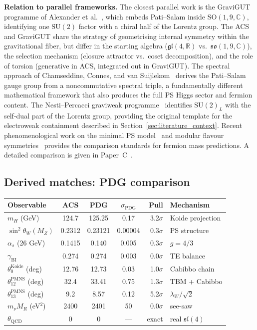 \documentclass[11pt,a4paper]{article}
\theoremstyle{plain}
\theoremstyle{definition}
\theoremstyle{remark}
\begin{document}
\textbf{Relation to parallel frameworks.}
The closest parallel work is the GraviGUT programme of Alexander
et al.~\cite{Alexander2025}, which embeds Pati--Salam inside
$\mathrm{SO}(1,9,\mathbb{C})$, identifying one $\mathrm{SU}(2)$
factor with a chiral half of the Lorentz group.  The ACS and GraviGUT
share the strategy of geometrising internal symmetry within the
gravitational fiber, but differ in the starting algebra
($\mathfrak{gl}(4,\mathbb{R})$ vs.\
$\mathfrak{so}(1,9,\mathbb{C})$), the selection mechanism
(closure attractor vs.\ coset decomposition), and the role of
torsion (generative in ACS, integrated out in GraviGUT).
The spectral approach of Chamseddine, Connes, and van
Suijlekom~\cite{ChamseddineConnes2015} derives the Pati--Salam gauge
group from a noncommutative spectral triple, a fundamentally different
mathematical framework that also produces the full PS Higgs sector
and fermion content.  The Nesti--Percacci
graviweak programme~\cite{NestiPercacci2008} identifies
$\mathrm{SU}(2)_L$ with the self-dual part of the Lorentz group,
providing the original template for the electroweak containment
described in Section~\ref{sec:literature_context}.
Recent phenomenological work on the minimal PS
model~\cite{MinimalPS2025} and modular flavour
symmetries~\cite{Belfkir2025} provides the comparison standards
for fermion mass predictions.
A detailed comparison is given in Paper~C~\cite{WallaceC}.

\subsection*{Derived matches: PDG comparison}
\label{sec:pdg-comparison}

\begin{center}
\begin{tabular}{lcccrl}
\toprule
Observable & ACS & PDG & $\sigma_{\mathrm{PDG}}$ & Pull & Mechanism \\
\midrule
$m_H$ (GeV)                  & 124.7     & 125.25     & 0.17     & 3.2$\sigma$ & Koide projection \\
$\sin^2\theta_W(M_Z)$        & 0.2312    & 0.23121    & 0.00004  & 0.3$\sigma$ & PS structure \\
$\alpha_s$ (26 GeV)           & 0.1415    & 0.140      & 0.005    & 0.3$\sigma$ & $g = 4/3$ \\
$\gamma_{\mathrm{BI}}$       & 0.274     & 0.274      & 0.003    & 0.0$\sigma$ & TE balance \\
$\theta_0^{\mathrm{Koide}}$ (deg) & 12.76 & 12.73     & 0.03     & 1.0$\sigma$ & Cabibbo chain \\
$\theta_{12}^{\mathrm{PMNS}}$ (deg) & 32.4 & 33.41   & 0.75     & 1.3$\sigma$ & TBM + Cabibbo \\
$\theta_{13}^{\mathrm{PMNS}}$ (deg) & 9.2  & 8.57    & 0.12     & 5.2$\sigma$ & $\lambda_W/\sqrt{2}$ \\
$m_\nu M_R$ (eV$^2$)         & 2400      & 2401       & 50       & 0.0$\sigma$ & see-saw \\
$\theta_{\mathrm{QCD}}$      & 0         & 0          & ---      & exact & real $\mathfrak{sl}(4)$ \\
\bottomrule
\end{tabular}
\end{center}
\end{document}
